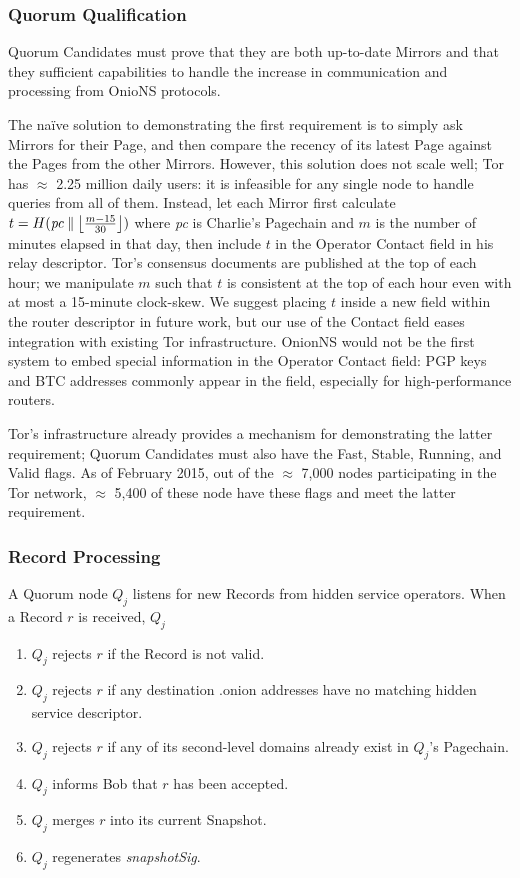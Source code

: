 \documentclass{sig-alternate}
\DeclarePairedDelimiter{\floor}{\lfloor}{\rfloor}
\newcommand*\concat{\mathbin{\|}}
\begin{document}
\subsubsection{Quorum Qualification} %

Quorum Candidates must prove that they are both up-to-date Mirrors and that they sufficient capabilities to handle the increase in communication and processing from OnioNS protocols.

The na\"{i}ve solution to demonstrating the first requirement is to simply ask Mirrors for their Page, and then compare the recency of its latest Page against the Pages from the other Mirrors. However, this solution does not scale well; Tor has $ \approx $ 2.25 million daily users\cite{TorMetrics}: it is infeasible for any single node to handle queries from all of them. Instead, let each Mirror first calculate $ t = H(\mathit{pc} \concat \floor[\big]{\frac{m - 15}{30}}) $ where \emph{pc} is Charlie's Pagechain and $ m $ is the number of minutes elapsed in that day, then include $ t $ in the Operator Contact field in his relay descriptor. Tor's consensus documents are published at the top of each hour; we manipulate $ m $ such that $ t $ is consistent at the top of each hour even with at most a 15-minute clock-skew. We suggest placing $ t $ inside a new field within the router descriptor in future work, but our use of the Contact field eases integration with existing Tor infrastructure. OnionNS would not be the first system to embed special information in the Operator Contact field: PGP keys and BTC addresses commonly appear in the field, especially for high-performance routers.

Tor's infrastructure already provides a mechanism for demonstrating the latter requirement; Quorum Candidates must also have the Fast, Stable, Running, and Valid flags. As of February 2015, out of the $ \approx $ 7,000 nodes participating in the Tor network, $ \approx $ 5,400 of these node have these flags and meet the latter requirement.\cite{TorMetrics}

\subsubsection{Record Processing} %

A Quorum node $ Q_{j} $ listens for new Records from hidden service operators. When a Record $ r $ is received, $ Q_{j} $

\begin{enumerate}[noitemsep]
	\item $ Q_{j} $ rejects $ r $ if the Record is not valid.
	\item $ Q_{j} $ rejects $ r $ if any destination .onion addresses have no matching hidden service descriptor.
	\item $ Q_{j} $ rejects $ r $ if any of its second-level domains already exist in $ Q_{j} $'s Pagechain.
	\item $ Q_{j} $ informs Bob that $ r $ has been accepted.
	\item $ Q_{j} $ merges $ r $ into its current Snapshot.
	\item $ Q_{j} $ regenerates \emph{snapshotSig}.
\end{enumerate}
\end{document}

